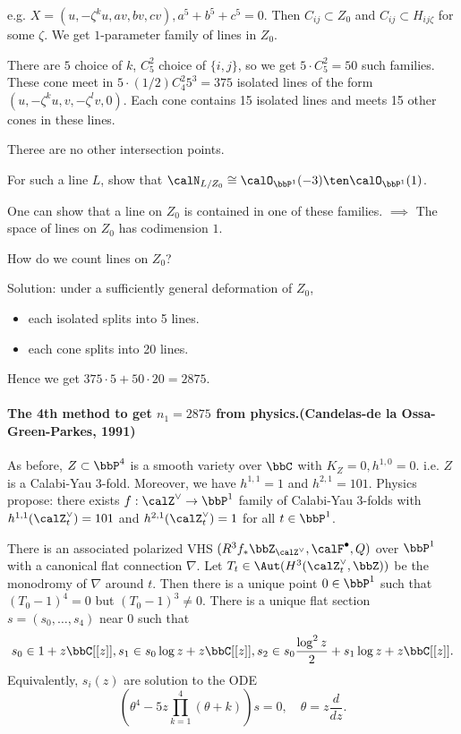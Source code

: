     e.g. \(X = (u,-\zeta^k u, av, bv,cv), a^5 + b^5 + c^5 = 0\).
    Then \(C_{ij} \subset Z_0\) and \(C_{ij} \subset H_{ij\zeta}\) for some \(\zeta\).
    We get \(1\)-parameter family of lines in \(Z_0\).

    There are \(5\) choice of \(k\), \(C_5^2\) choice of \(\{i,j\}\), so we get \(5 \cdot C_5^2 = 50\) such families.
    These cone meet in \(5 \cdot (1/2) C_4^2 5^3 = 375\) isolated lines of the form $(u, -\zeta^k u, v, -\zeta^l v, 0)$.
    Each cone contains 15 isolated lines and meets 15 other cones in these lines.

    Theree are no other intersection points.

    \begin{exercise}
        For such a line \(L\), show that \(\calN_{L/Z_0} \cong \calO_{\bbP^1}(-3) \ten \calO_{\bbP^1}(1)\).
    \end{exercise}

    One can show that a line on \(Z_0\) is contained in one of these families.
    \(\implies\) The space of lines on \(Z_0\) has codimension \(1\).

    \begin{question}
        How do we count lines on \(Z_0\)?
    \end{question}

    Solution: under a sufficiently general deformation of $Z_0$, 
    \begin{itemize}
        \item each isolated splits into 5 lines.
        \item each cone splits into 20 lines.
    \end{itemize}
    Hence we get \(375 \cdot 5 + 50 \cdot 20 = 2875\).

    \paragraph{The 4th method to get \(n_1=2875\) from physics.(Candelas-de la Ossa-Green-Parkes, 1991)}

    As before,  \(Z \subset \bbP^4\) is a smooth variety over \(\bbC\) with \(K_Z = 0, h^{1,0} = 0\).
    i.e. \(Z\) is a Calabi-Yau 3-fold.
    Moreover, we have \(h^{1,1} = 1\) and \(h^{2,1} = 101\).
    Physics propose:
    there exists \(f:\calZ^\vee \to \bbP^1\) family of Calabi-Yau 3-folds with \(h^{1,1}(\calZ_t^\vee) = 101\) and \(h^{2,1}(\calZ_t^\vee) = 1\) for all \(t \in \bbP^1\).

    There is an associated polarized VHS $(R^3f_* \bbZ_{\calZ^\vee}, \calF^\bullet, Q)$ over \(\bbP^1\) with a canonical flat connection \(\nabla\).
    Let \(T_t \in \Aut(H^3(\calZ_t^\vee, \bbZ))\) be the monodromy of \(\nabla\) around \(t\).
    Then there is a unique point \(0 \in \bbP^1\) such that \((T_0 - 1)^4 = 0\) but \((T_0 - 1)^3 \neq 0\).
    There is a unique flat section \(s = (s_0,\ldots,s_4)\) near \(0\) such that 
    \[ s_0 \in 1+z \bbC[[z]], s_1 \in s_0\log z + z \bbC[[z]], s_2 \in s_0 \frac{\log^2 z}{2} + s_1 \log z + z \bbC[[z]]. \]
    Equivalently, \(s_i(z)\) are solution to the ODE
    \[ \left( \theta^4 - 5 z \prod_{k=1}^4 ( \theta + k ) \right) s = 0,\quad \theta = z \frac{d}{dz}. \]

